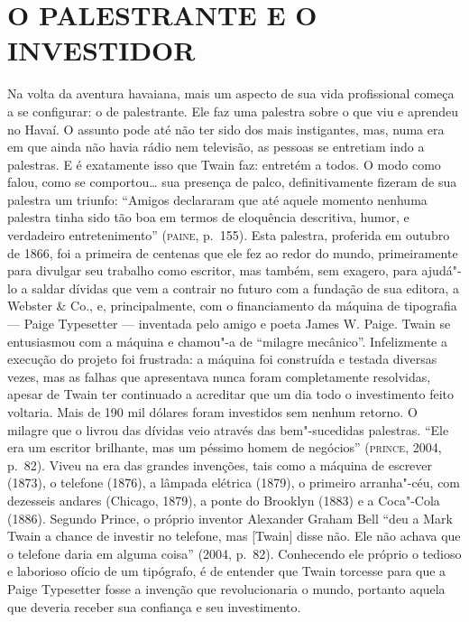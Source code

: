 \section{O PALESTRANTE E O INVESTIDOR}

Na volta da aventura havaiana, mais um aspecto de sua vida
profissional começa a se configurar: o de palestrante. Ele faz uma
palestra sobre o que viu e aprendeu no Havaí. O assunto pode até não ter
sido dos mais instigantes, mas, numa era em que ainda não havia rádio nem
televisão, as pessoas se entretiam indo a palestras. E é exatamente isso
que Twain faz: entretém a todos. O modo como falou, como se comportou\ldots{}
sua presença de palco, definitivamente fizeram de sua palestra
um triunfo: ``Amigos declararam que até aquele momento
nenhuma palestra tinha sido tão boa em termos de eloquência descritiva,
humor, e verdadeiro entretenimento'' (\textsc{paine}, p.~155). Esta
palestra, proferida em outubro de 1866, foi a primeira de centenas
que ele fez ao redor do mundo, primeiramente para divulgar seu
trabalho como escritor, mas também, sem exagero, para ajudá"-lo a saldar
dívidas que vem a contrair no futuro com a fundação de sua editora, a
Webster \& Co., e, principalmente, com o financiamento da máquina de
tipografia --- Paige Typesetter --- inventada pelo amigo e poeta James W.
Paige. Twain se entusiasmou com a máquina e chamou"-a de “milagre mecânico”.
Infelizmente a execução do projeto foi frustrada: a máquina foi construída
e testada diversas vezes, mas as falhas que apresentava nunca foram
completamente resolvidas, apesar de Twain ter continuado a acreditar que
um dia todo o investimento feito voltaria. Mais de 190 mil dólares
foram investidos sem nenhum retorno. O milagre que o livrou
das dívidas veio através das bem"-sucedidas palestras.
``Ele era um escritor brilhante, mas um péssimo homem de
negócios'' (\textsc{prince}, 2004, p.~82). Viveu na era das grandes
invenções, tais como a máquina de escrever (1873), o telefone
(1876), a lâmpada elétrica (1879), o primeiro arranha"-céu, com dezesseis andares
(Chicago, 1879), a ponte do Brooklyn (1883) e a Coca"-Cola (1886). Segundo
Prince, o próprio inventor Alexander Graham Bell ``deu a Mark
Twain a chance de investir no telefone, mas [Twain] disse não. Ele não
achava que o telefone daria em alguma coisa'' (2004, p.~82).
Conhecendo ele próprio o tedioso e laborioso ofício de um tipógrafo, é
de entender que Twain torcesse para que a Paige Typesetter fosse a
invenção que revolucionaria o mundo, portanto aquela que deveria
receber sua confiança e seu investimento.

